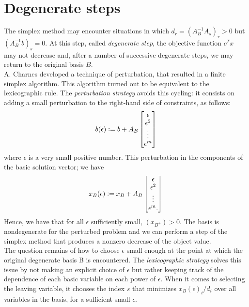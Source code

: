 \documentclass[a4paper,10 pt,titlepage,twoside]{report}
\theoremstyle{plain}
\theoremstyle{definition}
\theoremstyle{remark}
\begin{document}
 \section{Degenerate steps}
The simplex method may encounter situations in which $d_{r} = \left( A_{B}^{-1}A_{s}\right)_{r} > 0$ but $(A_{B}^{-1}b)_{s}= 0$. At this step, called \textit{degenerate step}, the objective function $c^{T}x$ may not decrease and, after a number of successive degenerate steps, we may return to the original basis $B$. \\
A. Charnes \cite{Lexico2} developed a technique of perturbation, that resulted in a finite simplex algorithm. This algorithm turned out to be equivalent to the lexicographic rule. The \textit{perturbation strategy} avoids this cycling: it consists on adding a small perturbation to the right-hand side of constraints, as follows:
\begin{equation*}
b(\epsilon) \vcentcolon= b + A_{B}
\begin{bmatrix}
\epsilon\\\epsilon^{2}\\\vdots\\\epsilon^{m}
\end{bmatrix}
\end{equation*}
where $\epsilon$ is a very small positive number. This perturbation in the components of the basic solution vector; we have
\begin{equation*}x_{B}(\epsilon) \vcentcolon= x_{B} + A_{B}
\begin{bmatrix}
\epsilon\\\epsilon^{2}\\\vdots\\\epsilon^{m}.
\end{bmatrix}
\end{equation*}
Hence, we have that for all $\epsilon$ sufficiently small, $(x_{B^{+}})>0$. The basis is nondegenerate for the perturbed problem and we can perform a step of the simplex method that produces a nonzero decrease of the object value.\\
The question remains of how to choose $\epsilon$ small enough at the point at which the original degenerate basis B is encountered. The \textit{lexicographic strategy} solves this issue by not making an explicit choice of $\epsilon$ but rather keeping track of the dependence of each basic variable on each power of $\epsilon$. When it comes to selecting the leaving variable, it chooses the index $s$ that minimizes $x_{B}(\epsilon)_{i}/d_{i}$ over all variables in the basis, for a sufficient small $\epsilon$.\\
\end{document}
